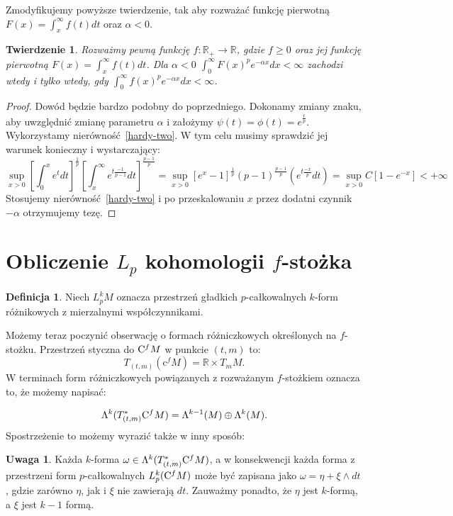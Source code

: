 \documentclass[licencjacka]{pracamgr}
\theoremstyle{definition}
\newtheorem{definition}{Definicja}[section]
\theoremstyle{definition}
\newtheorem{remark}{Uwaga}[section]
\theoremstyle{plain}
\theoremstyle{plain}
\theoremstyle{plain}
\newtheorem{theorem}{Twierdzenie}[section]
\theoremstyle{plain}
\def\cfm{\ensuremath\mathrm{C}^fM}
\def\M{\ensuremath M}
\begin{document}
Zmodyfikujemy powyższe twierdzenie, tak aby rozważać funkcję pierwotną
$F(x) = \int_x^\infty f(t) dt $ oraz $\alpha < 0$.

\begin{theorem}
  Rozważmy pewną funkcję $f: \mathbb{R}_{+} \rightarrow \mathbb{R}$, gdzie
  $f \geq 0$
  oraz jej funkcję pierwotną $F(x) = \int_x^\infty f(t) dt$. Dla $\alpha < 0$ 
 $\int_0^\infty F(x)^pe^{- \alpha x}dx < \infty$
zachodzi wtedy i tylko wtedy, gdy
$\int_0^\infty f(x)^p e^{-\alpha x}dx < \infty$.
\end{theorem}
\begin{proof}
  Dowód będzie bardzo podobny do poprzedniego. Dokonamy zmiany znaku,
  aby uwzględnić zmianę parametru $\alpha$ i 
 założymy $\psi(t) = \phi(t) =
 e^{ \frac{t}{p} }$.
 Wykorzystamy nierówność~\ref{hardy-two}. W tym celu musimy sprawdzić
 jej warunek konieczny i wystarczający:
 \[
\sup_{x > 0}
\left[
\int_0^x e^t dt
\right]^{\frac{1}{p}}
\left[
\int_x^\infty
    e^{t \frac{-1}{p-1}} dt
\right]^{\frac{p-1}{p}}
=
\sup_{x > 0}
\left[
  e^x - 1
\right]^{\frac{1}{p}}
(p-1)^{\frac{p-1}{p}}
\left(
    e^{t \frac{-x}{p}} dt
\right)
= 
\sup_{x > 0} C
\left[
  1 - e^{-x}
\right] < +\infty
 \]
 Stosujemy nierówność~\ref{hardy-two} i po przeskalowaniu $x$ przez
 dodatni czynnik $-\alpha$ otrzymujemy tezę.
\end{proof}

\section{Obliczenie $L_p$ kohomologii $f$-stożka}


\begin{definition}
  Niech $L_p^k M$ oznacza przestrzeń gładkich $p$-całkowalnych 
  $k$-form różnikowych z mierzalnymi  współczynnikami.
\end{definition}


Możemy teraz poczynić obserwację o formach różniczkowych określonych na 
$f$-stożku. Przestrzeń styczna do $\cfm$ w punkcie $(t, m)$ to:
\[
    T_{(t, m)} (\mathrm{c}^f M) = \mathbb{R} \times T_m M.
\]
W terminach form różniczkowych powiązanych z rozważanym $f$-stożkiem oznacza
to, że możemy napisać:

\[
\Lambda^k( T_{(t,m)}^\ast \cfm) = 
\Lambda^{k-1}(\M)  \oplus \Lambda^k(\M).
\]
Spostrzeżenie to możemy wyrazić także w inny sposób: 

\begin{remark}
  Każda $k$-forma $\omega \in \Lambda^k( T_{(t,m)}^\ast \cfm)$, 
a w konsekwencji każda forma z przestrzeni form $p$-całkowalnych  $L_p^k
(\cfm)$ może być zapisana jako $\omega = \eta + \xi \wedge dt$,
gdzie zarówno $\eta$, jak i  $\xi$ nie zawierają $dt$.  Zauważmy ponadto,
że $\eta$ jest $k$-formą, a $\xi$ jest $k-1$ formą. \\
\end{remark}
\end{document}
